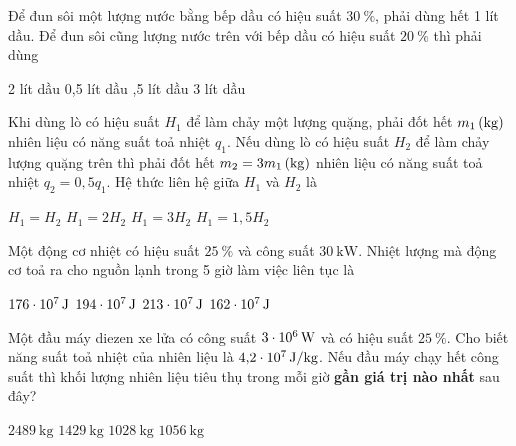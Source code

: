 \begin{ex}
	Để đun sôi một lượng nước bằng bếp dầu có hiệu suất $\SI{30}{\percent}$, phải dùng hết 1 lít dầu. Để đun sôi cũng lượng nước trên với bếp dầu có hiệu suất $\SI{20}{\percent}$ thì phải dùng
	
	\choice
	{2 lít dầu}
	{0,5 lít dầu}
	{,5 lít dầu}
	{3 lít dầu}
\end{ex}
\begin{ex}
	Khi dùng lò có hiệu suất $H_1$ để làm chảy một lượng quặng, phải đốt hết $\xsi{m_1}{\left(\kilogram\right)}$ nhiên liệu có năng suất toả nhiệt $q_1$. Nếu dùng lò có hiệu suất $H_2$ để làm chảy lượng quặng trên thì phải đốt hết $m_2=\xsi{3m_1}{\left(\kilogram\right)}$ nhiên liệu có năng suất toả nhiệt $q_2=0,5q_1$. Hệ thức liên hệ giữa $H_1$ và $H_2$ là
	
	\choice
	{$H_1=H_2$}
	{$H_1=2H_2$}
	{$H_1=3H_2$}
	{\True $H_1=1,5H_2$}
\end{ex}
\begin{ex}
	Một động cơ nhiệt có hiệu suất $\SI{25}{\percent}$ và công suất $\SI{30}{\kilo\watt}$. Nhiệt lượng mà động cơ toả ra cho nguồn lạnh trong 5 giờ làm việc liên tục là
	
	\choice
	{$\SI{176E7}{\joule}$}
	{$\SI{194E7}{\joule}$}
	{$\SI{213E7}{\joule}$}
	{\True $\SI{162E7}{\joule}$}
\end{ex}
\begin{ex}
	Một đầu máy diezen xe lửa có công suất $\SI{3E6}{\watt}$ và có hiệu suất $\SI{25}{\percent}$. Cho biết năng suất toả nhiệt của nhiên liệu là $\SI{4.2E7}{\joule/\kilogram}$. Nếu đầu máy chạy hết công suất thì khối lượng nhiên liệu tiêu thụ trong mỗi giờ \textbf{gần giá trị nào nhất} sau đây?
	
	\choice
	{$\SI{2489}{\kilogram}$}
	{$\SI{1429}{\kilogram}$}
	{\True $\SI{1028}{\kilogram}$}
	{$\SI{1056}{\kilogram}$}
\end{ex}

